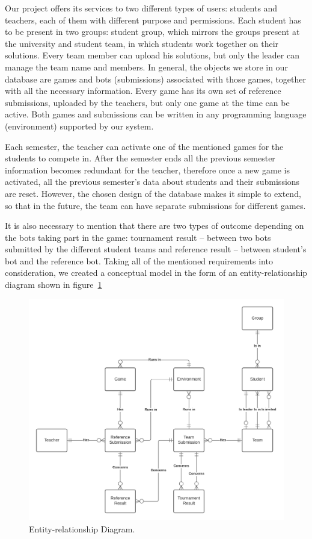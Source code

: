 Our project offers its services to two different types of users: students and teachers, each of them with different purpose and permissions. Each student has to be present in two groups: student group, which mirrors the groups present at the university and student team, in which students work together on their solutions. Every team member can upload his solutions, but only the leader can manage the team name and members. In general, the objects we store in our database are games and bots (submissions) associated with those games, together with all the necessary information. Every game has its own set of reference submissions, uploaded by the teachers, but only one game at the time can be active. Both games and submissions can be written in any programming language (environment) supported by our system. 

Each semester, the teacher can activate one of the mentioned games for the students to compete in. After the semester ends all the previous semester information becomes redundant for the teacher, therefore once a new game is activated, all the previous semester's data about students and their submissions are reset. However, the chosen design of the database makes it simple to extend, so that in the future, the team can have separate submissions for different games. 

It is also necessary to mention that there are two types of outcome depending on the bots taking part in the game: tournament result -- between two bots submitted by the different student teams and reference result -- between student's bot and the reference bot. Taking all of the mentioned requirements into consideration, we created a conceptual model in the form of an entity-relationship diagram shown in figure~\ref{fig:er_diagram}

\begin{figure}[t]
    \centering\includegraphics[width=\textwidth]{figures/erd_diagram.png}
    \caption{Entity-relationship Diagram.}\label{fig:er_diagram}
\end{figure}

